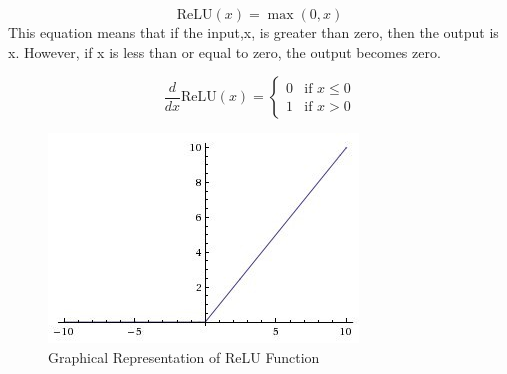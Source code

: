 \begin{equation}
\text{ReLU}(x) = \max(0, x)
\end{equation}
This equation means that if the input,x, is greater than zero, then the output is x. However, if 
x is less than or equal to zero, the output becomes zero.

\begin{equation}
\frac{d}{dx} \text{ReLU}(x) = 
\begin{cases} 
0 & \text{if } x \leq 0 \\
1 & \text{if } x > 0
\end{cases}
\end{equation}

\begin{figure}[H]
    \centering
    \includegraphics[scale=1]{images/RELU.jpg}
    \caption{Graphical Representation of ReLU Function}
    \label{fig:relu-}
\end{figure}



